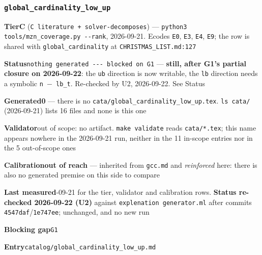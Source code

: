 \documentclass[10pt,a4paper]{article}
\newcommand{\entryfield}[2]{{\raggedright\textbf{#1}\quad #2\par}}
\begin{document}
\subsubsection*{\texttt{global\_\allowbreak{}cardinality\_\allowbreak{}low\_\allowbreak{}up}}
\label{entry:global-cardinality-low-up}
\entryfield{Tier}{\textbf{C} (\texttt{C literature + solver-\allowbreak{}decomposes}) --- \texttt{python3 tools/\allowbreak{}mzn\_\allowbreak{}coverage.\allowbreak{}py -\allowbreak{}-\allowbreak{}rank}, 2026-09-21. Ecodes \texttt{E0}, \texttt{E3}, \texttt{E4}, \texttt{E9}; the row is shared with \texttt{global\_cardinality} at \texttt{CHRISTMAS\_LIST.md:127}}
\entryfield{Status}{\texttt{nothing generated -\allowbreak{}-\allowbreak{}-\allowbreak{} blocked on G1} --- \textbf{still, after G1's partial closure on 2026-09-22}: the \texttt{ub} direction is now writable, the \texttt{lb} direction needs a symbolic \texttt{n $-$ lb\_t}. Re-checked by U2, 2026-09-22. See Status}
\entryfield{Generated}{\textbf{0} --- there is no \texttt{cata/\allowbreak{}global\_\allowbreak{}cardinality\_\allowbreak{}low\_\allowbreak{}up.\allowbreak{}tex}. \texttt{ls cata/} (2026-09-21) lists 16 files and none is this one}
\entryfield{Validator}{out of scope: no artifact. \texttt{make validate} reads \texttt{cata/*.tex}; this name appears nowhere in the 2026-09-21 run, neither in the 11 in-scope entries nor in the 5 out-of-scope ones}
\entryfield{Calibration}{\textbf{out of reach} --- inherited from \texttt{gcc.md} and \emph{reinforced} here: there is also no generated premise on this side to compare}
\entryfield{Last measured}{2026-09-21 for the tier, validator and calibration rows. \textbf{Status re-checked 2026-09-22 (U2)} against \texttt{explenation generator.ml} after commits \texttt{4547daf}/\texttt{1e747ee}; unchanged, and no new run}
\entryfield{Blocking gap}{\texttt{G1}}
\entryfield{Entry}{\texttt{catalog/global\_cardinality\_low\_up.md}}
\end{document}

